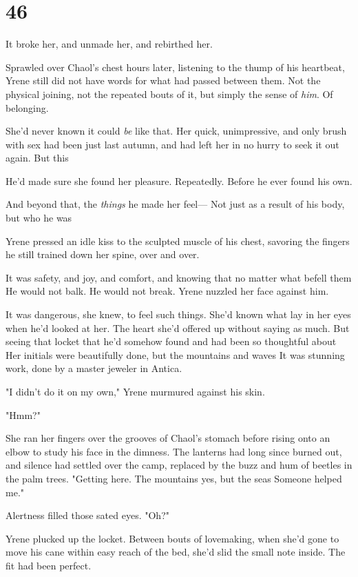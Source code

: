 
\chapter{46}

It broke her, and unmade her, and rebirthed her.

Sprawled over Chaol's chest hours later, listening to the thump of his heartbeat, Yrene still did not have words for what had passed between them. Not the physical joining, not the repeated bouts of it, but simply the sense of \emph{him}. Of belonging.

She'd never known it could \emph{be} like that. Her quick, unimpressive, and only brush with sex had been just last autumn, and had left her in no hurry to seek it out again. But this 

He'd made sure she found her pleasure. Repeatedly. Before he ever found his own.

And beyond that, the \emph{things} he made her feel--- Not just as a result of his body, but who he was 

Yrene pressed an idle kiss to the sculpted muscle of his chest, savoring the fingers he still trained down her spine, over and over.

It was safety, and joy, and comfort, and knowing that no matter what befell them  He would not balk. He would not break. Yrene nuzzled her face against him.

It was dangerous, she knew, to feel such things. She'd known what lay in her eyes when he'd looked at her. The heart she'd offered up without saying as much. But seeing that locket that he'd somehow found and had been so thoughtful about  Her initials were beautifully done, but the mountains and waves  It was stunning work, done by a master jeweler in Antica.

"I didn't do it on my own," Yrene murmured against his skin.

"Hmm?"

She ran her fingers over the grooves of Chaol's stomach before rising onto an elbow to study his face in the dimness. The lanterns had long since burned out, and silence had settled over the camp, replaced by the buzz and hum of beetles in the palm trees. "Getting here. The mountains yes, but the seas  Someone helped me."

Alertness filled those sated eyes. "Oh?"

Yrene plucked up the locket. Between bouts of lovemaking, when she'd gone to move his cane within easy reach of the bed, she'd slid the small note inside. The fit had been perfect.

